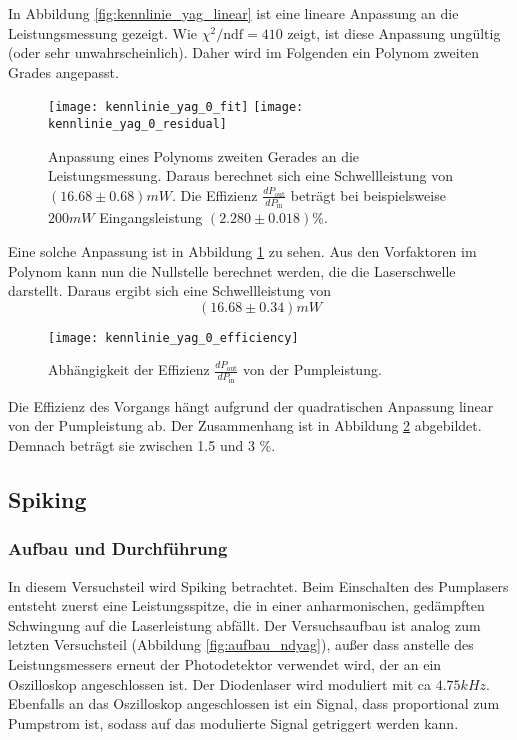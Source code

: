 \documentclass{../Misc/MontavonLaTeX/Montavon}
\newcommand{\halfwidth}{0.48\textwidth}
\begin{document}
In Abbildung \ref{fig:kennlinie_yag_linear} ist eine lineare Anpassung an die Leistungsmessung gezeigt. Wie $\chi^2 / \textrm{ndf} = 410$ zeigt, ist diese Anpassung ungültig (oder sehr unwahrscheinlich). Daher wird im Folgenden ein Polynom zweiten Grades angepasst.

\begin{figure}
\centering
\texttt{[image: kennlinie\_yag\_0\_fit]}
\texttt{[image: kennlinie\_yag\_0\_residual]}
\caption{Anpassung eines Polynoms zweiten Gerades an die Leistungsmessung. Daraus berechnet sich eine Schwellleistung von $(16.68 \pm 0.68) \unit{mW}$. Die Effizienz $\frac{dP_\textrm{out}}{dP_\textrm{in}}$ beträgt bei beispielsweise $200 \unit{mW}$ Eingangsleistung $(2.280 \pm 0.018) \%$.}
\label{fig:kennlinie_yag_0}
\end{figure}

Eine solche Anpassung ist in Abbildung \ref{fig:kennlinie_yag_0} zu sehen. Aus den Vorfaktoren im Polynom kann nun die Nullstelle berechnet werden, die die Laserschwelle darstellt. Daraus ergibt sich eine Schwellleistung von
\[
	(16.68 \pm 0.34) \unit{mW}
\]

\begin{figure}
\centering
\texttt{[image: kennlinie\_yag\_0\_efficiency]}
\caption{Abhängigkeit der Effizienz $\frac{dP_\textrm{out}}{dP_\textrm{in}}$ von der Pumpleistung.}
\label{fig:kennlinie_yag_0_efficiency}
\end{figure}

Die Effizienz des Vorgangs hängt aufgrund der quadratischen Anpassung linear von der Pumpleistung ab. Der Zusammenhang ist in Abbildung \ref{fig:kennlinie_yag_0_efficiency} abgebildet. Demnach beträgt sie zwischen 1.5 und 3 $\unit{\%}$.

\subsection{Spiking}
\subsubsection{Aufbau und Durchführung}
In diesem Versuchsteil wird Spiking betrachtet. Beim Einschalten des Pumplasers entsteht zuerst eine Leistungsspitze, die in einer anharmonischen, gedämpften Schwingung auf die Laserleistung abfällt. 
Der Versuchsaufbau ist analog zum letzten Versuchsteil (Abbildung \ref{fig:aufbau_ndyag}), außer dass anstelle des Leistungsmessers erneut der Photodetektor verwendet wird, der an ein Oszilloskop angeschlossen ist. Der Diodenlaser wird moduliert mit ca $4.75 \unit{kHz}$. 
Ebenfalls an das Oszilloskop angeschlossen ist ein Signal, dass proportional zum Pumpstrom ist, sodass auf das modulierte Signal getriggert werden kann.
\end{document}
